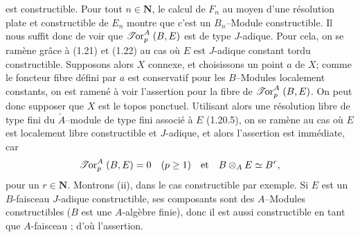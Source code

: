 est constructible. Pour tout $n \in \mathbf{N}$, le calcul de $F_n$ au moyen d'une résolution plate et constructible de $E_n$ montre que c'est un $B_n$--Module constructible. Il nous suffit donc de voir que $\mathrel{\mathscr{T}\mkern-2mu\text{\upshape or}}^A_p(B, E)$ est de type $J$-adique. Pour cela, on se ramène grâce à (1.21) et (1.22) au cas où $E$ est $J$-adique constant tordu constructible. Supposons alors $X$ connexe, et choisissons un point $a$ de $X$; comme le foncteur fibre défini par $a$ est conservatif pour les $B$--Modules localement constants, on est ramené à voir l'assertion pour la fibre de $\mathrel{\mathscr{T}\mkern-2mu\text{\upshape or}}^A_p(B, E)$. On peut donc supposer que $X$ est le topos ponctuel. Utilisant alors une résolution libre de type fini du $\check{A}$--module de type fini associé à $E$ (1.20.5), on se ramène au cas où $E$ est localement libre constructible et $J$-adique, et alors l'assertion est immédiate, car
$$
\mathrel{\mathscr{T}\mkern-2mu\text{\upshape or}}^A_p(B, E) = 0 \quad (p \geq 1) \quad \text{et} \quad B \otimes_A E \simeq B^r,
$$
pour un $r \in \mathbf{N}$. Montrons (ii), dans le cas constructible par exemple. Si $E$ est un $B$-faisceau $J$-adique constructible, ses composants sont des $A$--Modules constructibles ($B$ est une $A$-algèbre finie), donc il est aussi constructible en tant que $A$-faisceau ; d'où l'assertion.

